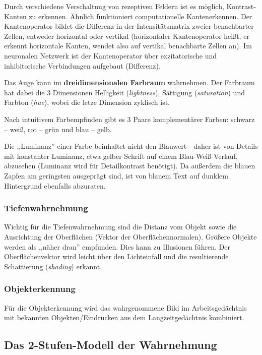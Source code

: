Durch verschiedene Verschaltung von rezeptiven Feldern ist es möglich, Kontrast-Kanten
zu erkennen. Ähnlich funktioniert computationelle Kantenerkennen. Der Kantenoperator
bildet die Differenz in der Intensitätsmatrix zweier benachbarter Zellen, entweder
horizontal oder vertikal (horizontaler Kantenoperator heißt, er erkennt horizontale
Kanten, wendet also auf vertikal benachbarte Zellen an). Im neuronalen Netzwerk ist
der Kantenoperator über exzitatorische und inhibitorische Verbindungen aufgebaut (Differenz).

Das Auge kann im \textbf{dreidimensionalen Farbraum} wahrnehmen. Der Farbraum hat dabei
die 3 Dimensionen Helligkeit (\emph{lightness}), Sättigung (\emph{saturation}) und
Farbton (\emph{hue}), wobei die letze Dimension zyklisch ist.

Nach intuitivem Farbempfinden gibt es 3 Paare komplementärer Farben: schwarz -- weiß,
rot -- grün und blau -- gelb.

Die ,,Luminanz'' einer Farbe beinhaltet nicht den Blauwert - daher ist von Details
mit konstanter Luminanz, etwa gelber Schrift auf einem Blau-Weiß-Verlauf, abzusehen
(Luminanz wird für Detailkontrast benötigt). Da außerdem die blauen Zapfen am geringsten
ausgeprägt sind, ist von blauem Text auf dunklem Hintergrund ebenfalls abzuraten.

\subsubsection{Tiefenwahrnehmung}

Wichtig für die Tiefenwahrnehmung sind die Distanz vom Objekt sowie die Ausrichtung
der Oberflächen (Vektor der Oberflächennormalen). Größere Objekte werden als ,,näher
dran'' empfunden. Dies kann zu Illusionen führen. Der Oberflächenvektor wird leicht
über den Lichteinfall und die resultierende Schattierung (\emph{shading}) erkannt.

\subsubsection{Objekterkennung}

Für die Objekterkennung wird das wahrgenommene Bild im Arbeitsgedächtnis mit bekannten
Objekten/Eindrücken aus dem Langzeitgedächtnis kombiniert.

\subsection{Das 2-Stufen-Modell der Wahrnehmung}

